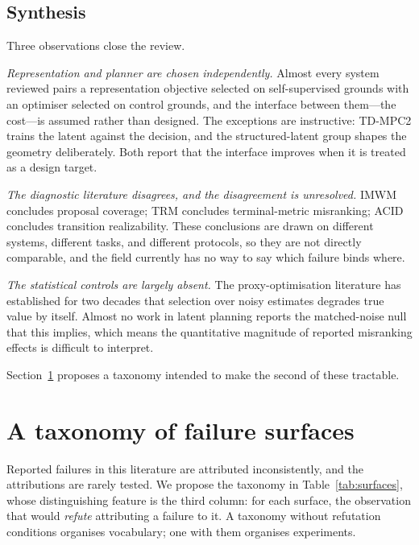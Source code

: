 \documentclass[11pt,letterpaper]{article}
\begin{document}
\subsection{Synthesis}\label{sec:lit-synth}

Three observations close the review.

\emph{Representation and planner are chosen independently.} Almost every system
reviewed pairs a representation objective selected on self-supervised grounds
with an optimiser selected on control grounds, and the interface between them---the
cost---is assumed rather than designed. The exceptions are instructive:
TD-MPC2 trains the latent against the decision, and the structured-latent group
shapes the geometry deliberately. Both report that the interface improves when
it is treated as a design target.

\emph{The diagnostic literature disagrees, and the disagreement is unresolved.}
IMWM concludes proposal coverage; TRM concludes terminal-metric misranking; ACID
concludes transition realizability. These conclusions are drawn on different
systems, different tasks, and different protocols, so they are not directly
comparable, and the field currently has no way to say which failure binds where.

\emph{The statistical controls are largely absent.} The proxy-optimisation
literature has established for two decades that selection over noisy estimates
degrades true value by itself. Almost no work in latent planning reports the
matched-noise null that this implies, which means the quantitative magnitude of
reported misranking effects is difficult to interpret.

Section~\ref{sec:failures} proposes a taxonomy intended to make the second of
these tractable.

\section{A taxonomy of failure surfaces}\label{sec:failures}

Reported failures in this literature are attributed inconsistently, and the
attributions are rarely tested. We propose the taxonomy in
Table~\ref{tab:surfaces}, whose distinguishing feature is the third column: for
each surface, the observation that would \emph{refute} attributing a failure to
it. A taxonomy without refutation conditions organises vocabulary; one with them
organises experiments.
\end{document}
